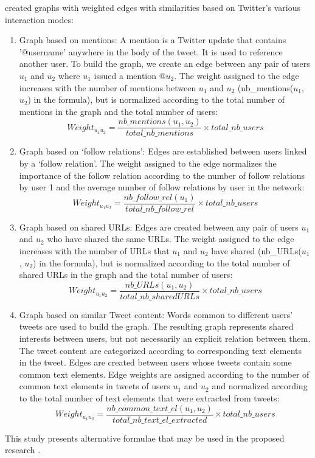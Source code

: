  created graphs with weighted edges with similarities based on Twitter's various interaction modes:
\begin {enumerate}
\item Graph based on mentions: A mention is a Twitter update that contains '@username' anywhere in the body of the tweet. It is used to reference another user. To build the graph, we create an edge between any pair of users $u_1$ and $u_2$ where $u_1$ issued a mention @$u_2$. The weight assigned to the edge increases with the number of mentions between $u_1$ and $u_2$ (nb\_mentions($u_1$, $u_2$) in the formula), but is normalized according to the total number of mentions in the graph and the total number of users:
\begin{equation}
Weight_{u_1 u_2} = \frac{nb\_mentions(u_1, u_2)}{total\_nb\_mentions} \times total\_nb\_users
\end{equation}
\item Graph based on ‘follow relations’: Edges are established between users linked by a ‘follow relation’. The weight assigned to the edge normalizes the importance of the follow relation according to the number of follow relations by user 1 and the average number of follow relations by user in the network:
\begin{equation}
Weight_{u_1 u_2} = \frac{nb\_follow\_rel(u_1)}{total\_nb\_follow\_rel} \times total\_nb\_users
\end{equation}
\item Graph based on shared URLs: Edges are created between any pair of users $u_1$ and $u_2$ who have shared the same URLs. The weight assigned to the edge increases with the number of URLs that $u_1$ and $u_2$ have shared (nb\_URLs($u_1$, $u_2$) in the formula), but is normalized according to the total number of shared URLs in the graph and the total number of users:
\begin{equation}
Weight_{u_1 u_2} = \frac{nb\_URLs(u_1, u_2)}{total\_nb\_sharedURLs} \times total\_nb\_users
\end{equation}
\item Graph based on similar Tweet content: Words common to different users’ tweets are used to build the graph. The resulting graph represents shared interests between users, but not necessarily an explicit relation between them. The tweet content are categorized according to corresponding text elements in the tweet. Edges are created between users whose tweets contain some common text elements. Edge weights are assigned according to the number of common text elements in tweets of users $u_1$ and $u_2$ and normalized according to the total number of text elements that were extracted from tweets:
\begin{equation}
Weight_{u_1 u_2} = \frac{nb\_common\_text\_el(u_1, u_2)}{total\_nb\_text\_el\_extracted} \times total\_nb\_users
\end{equation}

\end {enumerate}
This study presents alternative formulae that may be used in the proposed research \cite{Bakillah:2014}.

